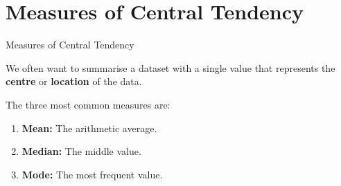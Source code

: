 \section{Measures of Central Tendency}

\begin{frame}{Measures of Central Tendency}
    
    We often want to summarise a dataset with a single value that represents the \textbf{centre} or \textbf{location} of the data.
    

    The three most common measures are:
    \begin{enumerate}
        \item \textbf{Mean:} The arithmetic average.
        \item \textbf{Median:} The middle value.
        \item \textbf{Mode:} The most frequent value.
    \end{enumerate}
\end{frame}

